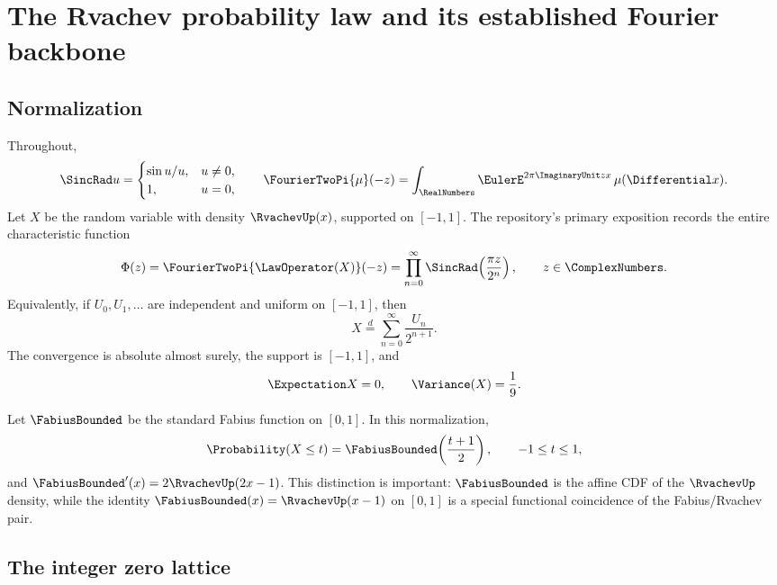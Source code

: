 \documentclass[11pt,oneside]{article}
\theoremstyle{definition}
\theoremstyle{remark}
\begin{document}
\section{The Rvachev probability law and its established Fourier backbone}
\label{sec:backbone}

\subsection{Normalization}

Throughout,
\[
 \SincRad u=\begin{cases}\sin u/u,&u\ne0,\\1,&u=0,\end{cases}
 \qquad
 \FourierTwoPi{\mu}(-z)=\int_{\RealNumbers}\EulerE^{2\pi\ImaginaryUnit zx}\,\mu(\Differential x).
\]
Let $X$ be the random variable with density $\RvachevUp(x)$, supported on $[-1,1]$.
The repository's primary exposition records the entire characteristic function~\cite{ProveItPrimary}
\begin{equation}
 \Phi(z)=\FourierTwoPi{\LawOperator(X)}(-z)
 =\prod_{n=0}^{\infty}\SincRad\!\left(\frac{\pi z}{2^n}\right),
 \qquad z\in\ComplexNumbers.
 \label{eq:Phi}
\end{equation}
Equivalently, if $U_0,U_1,\ldots$ are independent and uniform on $[-1,1]$, then
\begin{equation}
 X\overset d=\sum_{n=0}^{\infty}\frac{U_n}{2^{n+1}}.
 \label{eq:X-random-series}
\end{equation}
The convergence is absolute almost surely, the support is $[-1,1]$, and
\begin{equation}
 \Expectation X=0,
 \qquad
 \Variance(X)=\frac19.
 \label{eq:X-variance}
\end{equation}

Let $\FabiusBounded$ be the standard Fabius function on $[0,1]$.  In this normalization,
\begin{equation}
 \Probability(X\le t)=\FabiusBounded\!\left(\frac{t+1}{2}\right),
 \qquad -1\le t\le1,
 \label{eq:F-cdf}
\end{equation}
and $\FabiusBounded'(x)=2\RvachevUp(2x-1)$.  This distinction is important:
$\FabiusBounded$ is the affine CDF of the $\RvachevUp$ density, while the
identity $\FabiusBounded(x)=\RvachevUp(x-1)$ on $[0,1]$ is a special
functional coincidence of the Fabius/Rvachev pair.

\subsection{The integer zero lattice}
\end{document}
